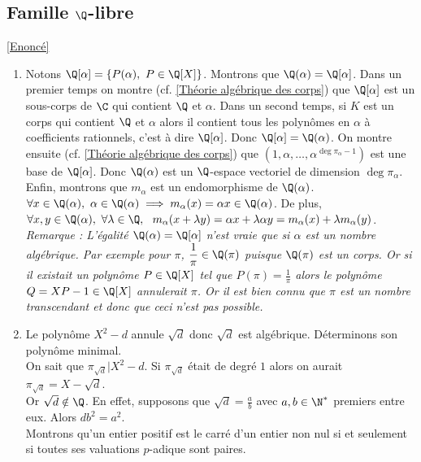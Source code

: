 \documentclass[8pt]{book}
\begin{document}
	\subsection{Famille $\Q$-libre }
	\label{Famille Q-libre corrigé}
	\textcolor{blue}{\hyperref[Famille Q-libre]{[Enoncé]}}\\
	\begin{enumerate}[leftmargin=*]
		\item Notons $\Q[\alpha]=\{P(\alpha),\ P\in \Q[X]\}$. Montrons que $\Q(\alpha)=\Q[\alpha]$. Dans un premier temps on montre (cf. \ref{Théorie algébrique des corps}) que $\Q[\alpha]$ est un sous-corps de $\C$ qui contient $\Q$ et $\alpha$. Dans un second temps, si $K$ est un corps qui contient $\Q$ et $\alpha$ alors il contient tous les polynômes en $\alpha$ à coefficients rationnels, c'est à dire $\Q[\alpha]$. Donc $\Q[\alpha]=\Q(\alpha)$.
		On montre ensuite (cf. \ref{Théorie algébrique des corps}) que $(1,\alpha,\dots,\alpha^{\deg\pi_\alpha-1})$ est une base de $\Q[\alpha]$. Donc $\Q(\alpha)$ est un $\Q$-espace vectoriel de dimension $\deg\pi_\alpha$.\\
		Enfin, montrons que $m_\alpha$ est un endomorphisme de $\Q(\alpha)$.\\
		$\forall x\in \Q(\alpha),\ \alpha\in \Q(\alpha)\implies m_\alpha(x)=\alpha x\in \Q(\alpha)$. De plus, $\forall x,y\in \Q(\alpha),\ \forall \lambda\in \Q,\ \ m_\alpha(x+\lambda y)=\alpha x+\lambda\alpha y=m_\alpha(x)+\lambda m_\alpha(y)$.\\
		\textit{Remarque : L'égalité $\Q(\alpha)=\Q[\alpha]$ n'est vraie que si $\alpha$ est un nombre algébrique. Par exemple pour $\pi$, $\displaystyle\frac{1}{\pi}\in \Q(\pi)$ puisque $\Q(\pi)$ est un corps. Or si il existait un polynôme $P\in \Q[X]$ tel que $P(\pi)=\displaystyle\frac{1}{\pi}$ alors le polynôme $Q=XP-1\in \Q[X]$ annulerait $\pi$. Or il est bien connu que $\pi$ est un nombre transcendant et donc que ceci n'est pas possible.}
		\item Le polynôme $X^2-d$ annule $\sqrt d$ donc $\sqrt d$ est algébrique. Déterminons son polynôme minimal.\\
		On sait que $\pi_{\sqrt d}|X^2-d$. Si $\pi_{\sqrt d}$ était de degré $1$ alors on aurait $\pi_{\sqrt d}=X-\sqrt d$.\\
		Or $\sqrt d\notin \Q$. En effet, supposons que $\sqrt d=\displaystyle\frac{a}{b}$ avec $a,b\in \N^*$ premiers entre eux. Alors $db^2=a^2$.\\
		Montrons qu'un entier positif est le carré d'un entier non nul si et seulement si toutes ses valuations $p$-adique sont paires. 

\end{enumerate}
\end{document}
